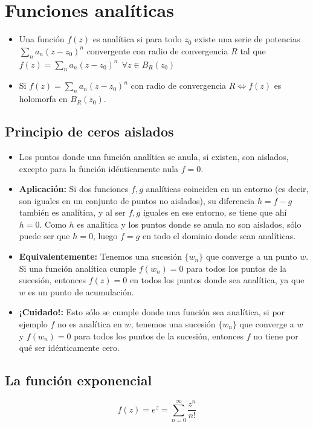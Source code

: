 \documentclass[paper=a4, fontsize=11pt]{scrartcl}
\numberwithin{equation}{section}
\numberwithin{figure}{section}
\numberwithin{table}{section}
\begin{document}
\newpage
\section{Funciones analíticas}
\begin{itemize}
\item Una función $f(z)$ es analítica si para todo $z_0$ existe una serie de potencias $\sum_n a_n(z-z_0)^n$  convergente con radio de convergencia $R$ tal que $\boxed{f(z) =\sum_n a_n(z-z_0)^n\ \ \forall z \in B_R(z_0)}$
\item Si $f(z)=\sum_n a_n(z-z_0)^n$ con radio de convergencia $R \iff f(z)$ es holomorfa en $B_R(z_0)$.
\end{itemize}

\subsection{Principio de ceros aislados}
\begin{itemize}
\item Los puntos donde una función analítica se anula, si existen, son aislados, excepto para la función idénticamente nula $f=0$.
\item \textbf{Aplicación:} Si dos funciones $f,g$ analíticas coinciden en un entorno (es decir, son iguales en un conjunto de puntos no aislados), su diferencia $h=f-g$ también es analítica, y al ser $f,g$ iguales en ese entorno, se tiene que ahí $h=0$. Como $h$ es analítica y los puntos donde se anula no son aislados, sólo puede ser que $h=0$, luego $f=g$ en todo el dominio donde sean analíticas.
\item \textbf{Equivalentemente:} Tenemos una sucesión $\{w_n\}$ que converge a un punto $w$. Si una función analítica cumple $f(w_n) = 0$ para todos los puntos de la sucesión, entonces $f(z)=0$ en todos los puntos donde sea analítica, ya que $w$ es un punto de acumulación.
\item \textbf{¡Cuidado!:} Esto sólo se cumple donde una función sea analítica, si por ejemplo $f$ no es analítica en $w$, tenemos una sucesión $\{w_n\}$ que converge a $w$ y $f(w_n) = 0$ para todos los puntos de la sucesión, entonces $f$ no tiene por qué ser idénticamente cero.
\end{itemize}

\subsection{La función exponencial}
$$f(z) = e^z = \sum_{n=0}^\infty \frac{z^n}{n!}$$
\end{document}
